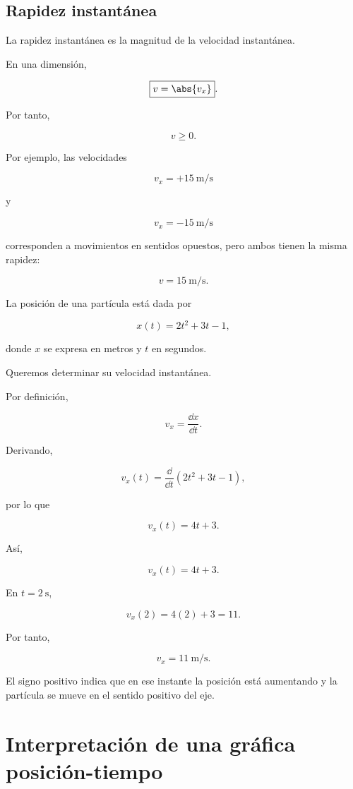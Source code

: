\subsection{Rapidez instantánea}

La rapidez instantánea es la magnitud de la velocidad instantánea.

En una dimensión,

\[ \boxed{v=\abs{v_x}}. \]

Por tanto,

\[ v\geq0. \]

Por ejemplo, las velocidades

\[ v_x=+\SI{15}{\meter\per\second} \]

y

\[ v_x=-\SI{15}{\meter\per\second} \]

corresponden a movimientos en sentidos opuestos, pero ambos tienen la misma
rapidez:

\[ v=\SI{15}{\meter\per\second}. \]


\begin{ejemplo}

La posición de una partícula está dada por

\[ x(t)=2t^2+3t-1, \]

donde \(x\) se expresa en metros y \(t\) en segundos.

Queremos determinar su velocidad instantánea.

Por definición,

\[
v_x=\frac{\dd x}{\dd t}.
\]

Derivando,

\[
v_x(t)
=\frac{\dd}{\dd t}\left(2t^2+3t-1\right),
\]

por lo que

\[ v_x(t)=4t+3. \]

Así,

\[ \boxed{v_x(t)=4t+3}. \]

En \(t=\SI{2}{\second}\),

\[
v_x(2)
=4(2)+3
=11.
\]

Por tanto,

\[ \boxed{v_x=\SI{11}{\meter\per\second}}. \]

El signo positivo indica que en ese instante la posición está aumentando y
la partícula se mueve en el sentido positivo del eje.
\end{ejemplo}


\section{Interpretación de una gráfica posición-tiempo}

